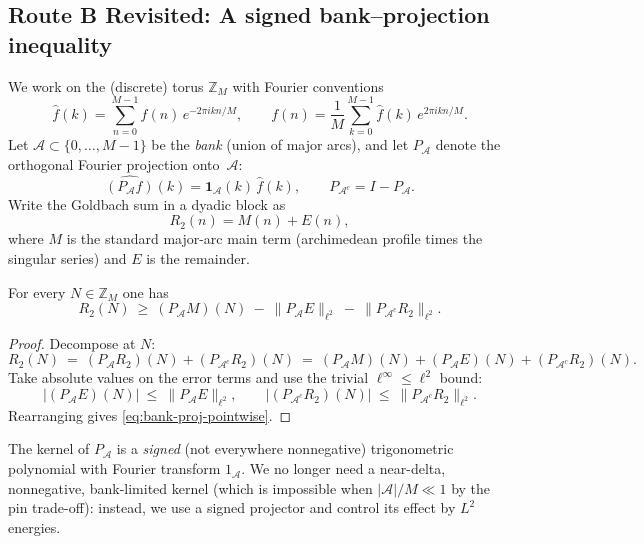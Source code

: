 \subsection{Route B Revisited: A signed bank–projection inequality}\label{sec:bank-projection}

We work on the (discrete) torus $\mathbb{Z}_M$ with Fourier conventions
\[
\widehat f(k)=\sum_{n=0}^{M-1} f(n)\,e^{-2\pi i kn/M},
\qquad
f(n)=\frac{1}{M}\sum_{k=0}^{M-1} \widehat f(k)\,e^{2\pi i kn/M}.
\]
Let $\mathcal{A}\subset\{0,\dots,M-1\}$ be the \emph{bank} (union of major arcs), and let $P_{\mathcal{A}}$ denote the orthogonal Fourier projection onto~$\mathcal{A}$:
\[
\widehat{(P_{\mathcal{A}} f)}(k)=\mathbf{1}_{\mathcal{A}}(k)\,\widehat f(k),
\qquad
P_{\mathcal{A}^c}=I-P_{\mathcal{A}}.
\]
Write the Goldbach sum in a dyadic block as
\[
R_2(n)=M(n)+E(n),
\]
where $M$ is the standard major-arc main term (archimedean profile times the singular series) and $E$ is the remainder.

\begin{theorem}\label{thm:bank-projection}
For every $N\in\mathbb{Z}_M$ one has
\begin{equation}\label{eq:bank-proj-pointwise}
R_2(N)\ \ge\ (P_{\mathcal{A}} M)(N)\ -\ \|P_{\mathcal{A}}E\|_{\ell^2}\ -\ \|P_{\mathcal{A}^c}R_2\|_{\ell^2}.
\end{equation}
\end{theorem}

\begin{proof}
Decompose at $N$:
\[
R_2(N)\ =\ (P_{\mathcal{A}}R_2)(N) + (P_{\mathcal{A}^c}R_2)(N)
\ =\ (P_{\mathcal{A}}M)(N)+(P_{\mathcal{A}}E)(N)+(P_{\mathcal{A}^c}R_2)(N).
\]
Take absolute values on the error terms and use the trivial $\ell^\infty\!\le\!\ell^2$ bound:
\[
|(P_{\mathcal{A}}E)(N)|\ \le\ \|P_{\mathcal{A}}E\|_{\ell^2},\qquad
|(P_{\mathcal{A}^c}R_2)(N)|\ \le\ \|P_{\mathcal{A}^c}R_2\|_{\ell^2}.
\]
Rearranging gives \eqref{eq:bank-proj-pointwise}.
\end{proof}

\begin{remark}
The kernel of $P_{\mathcal{A}}$ is a \emph{signed} (not everywhere nonnegative) trigonometric polynomial with Fourier transform $1_{\mathcal{A}}$.
We no longer need a near-delta, nonnegative, bank-limited kernel (which is impossible when $|\mathcal{A}|/M\ll 1$ by the pin trade-off): instead, we use a signed projector and control its effect by $L^2$ energies.
\end{remark}

